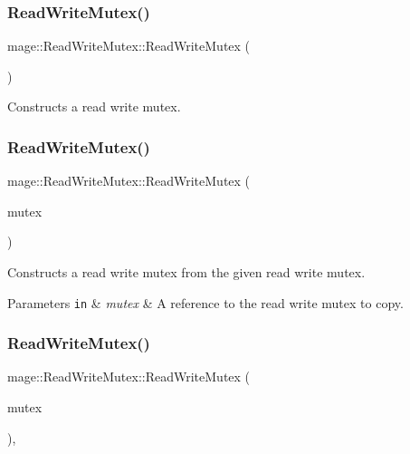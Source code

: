 \subsubsection{\texorpdfstring{Read\+Write\+Mutex()}{ReadWriteMutex()}\hspace{0.1cm}{\footnotesize\ttfamily [1/3]}}
{\footnotesize\ttfamily mage\+::\+Read\+Write\+Mutex\+::\+Read\+Write\+Mutex (\begin{DoxyParamCaption}{ }\end{DoxyParamCaption})\hspace{0.3cm}{\ttfamily [noexcept]}}

Constructs a read write mutex. \hypertarget{structmage_1_1_read_write_mutex_aacb2f69e7e2b084147e1e45628e9dd67}{}\label{structmage_1_1_read_write_mutex_aacb2f69e7e2b084147e1e45628e9dd67} 
\subsubsection{\texorpdfstring{Read\+Write\+Mutex()}{ReadWriteMutex()}\hspace{0.1cm}{\footnotesize\ttfamily [2/3]}}
{\footnotesize\ttfamily mage\+::\+Read\+Write\+Mutex\+::\+Read\+Write\+Mutex (\begin{DoxyParamCaption}\item[{const \hyperlink{structmage_1_1_read_write_mutex}{Read\+Write\+Mutex} \&}]{mutex }\end{DoxyParamCaption})\hspace{0.3cm}{\ttfamily [delete]}}

Constructs a read write mutex from the given read write mutex.


\begin{DoxyParams}[1]{Parameters}
\mbox{\tt in}  & {\em mutex} & A reference to the read write mutex to copy. \\
\hline
\end{DoxyParams}
\hypertarget{structmage_1_1_read_write_mutex_a35e15c17527ef771920129c4e381eb17}{}\label{structmage_1_1_read_write_mutex_a35e15c17527ef771920129c4e381eb17} 
\subsubsection{\texorpdfstring{Read\+Write\+Mutex()}{ReadWriteMutex()}\hspace{0.1cm}{\footnotesize\ttfamily [3/3]}}
{\footnotesize\ttfamily mage\+::\+Read\+Write\+Mutex\+::\+Read\+Write\+Mutex (\begin{DoxyParamCaption}\item[{\hyperlink{structmage_1_1_read_write_mutex}{Read\+Write\+Mutex} \&\&}]{mutex }\end{DoxyParamCaption})\hspace{0.3cm}{\ttfamily [default]}, {\ttfamily [noexcept]}}

